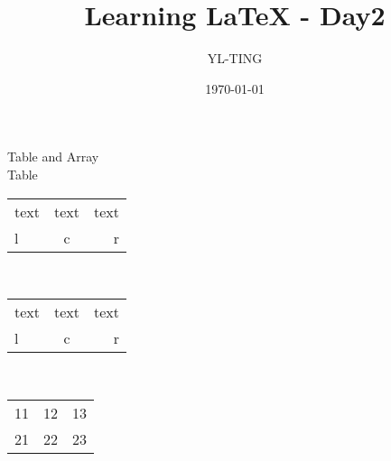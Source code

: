 \documentclass{article}
\author{YL-TING}
\title{Learning LaTeX - Day2}
\date{\today}
\begin{document}
    \maketitle
    \newpage
    \begin{center}
        {\LARGE Table and Array}\\[15pt]

        {\LARGE Table}\\[5pt]
        \begin{tabular}{lcr} 
            text & text & text\\
            l    & c    & r
        \end{tabular}\\[15pt]


        \begin{tabular}{|lc||r|}
            \hline
            text \vline & text & text\\
            l    \vline & c    & r\\
            \hline \hline
        \end{tabular}\\[15pt]

        \begin{tabular}{|cc|c|}
            11 & 12 & 13 \\
            \hhline{|-~|=|}
            21 & 22 & 23
            
        \end{tabular}\\[15pt]


\end{center}
\end{document}
